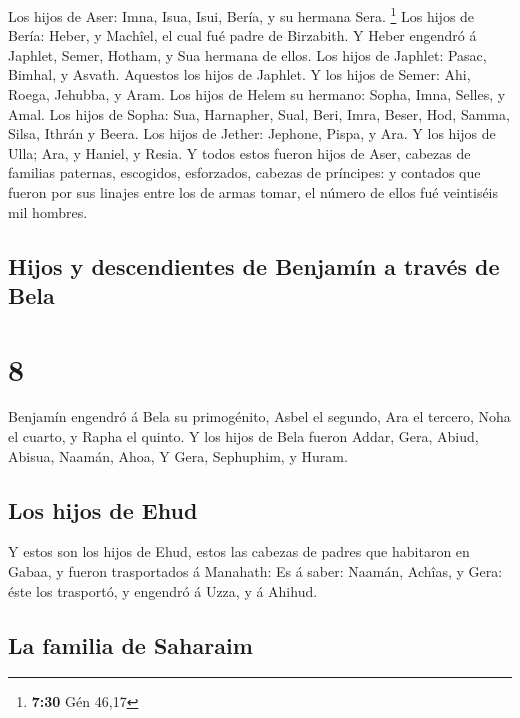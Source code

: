  Los hijos de Aser: Imna, Isua, Isui, Bería, y su hermana
Sera. \footnote{\textbf{7:30} Gén 46,17}  Los hijos de
Bería: Heber, y Machîel, el cual fué padre de Birzabith.  Y
Heber engendró á Japhlet, Semer, Hotham, y Sua hermana de ellos.
 Los hijos de Japhlet: Pasac, Bimhal, y Asvath. Aquestos
los hijos de Japhlet.  Y los hijos de Semer: Ahi, Roega,
Jehubba, y Aram.  Los hijos de Helem su hermano: Sopha,
Imna, Selles, y Amal.  Los hijos de Sopha: Sua, Harnapher,
Sual, Beri, Imra,  Beser, Hod, Samma, Silsa, Ithrán y
Beera.  Los hijos de Jether: Jephone, Pispa, y Ara.
 Y los hijos de Ulla; Ara, y Haniel, y Resia. 
Y todos estos fueron hijos de Aser, cabezas de familias paternas,
escogidos, esforzados, cabezas de príncipes: y contados que fueron por
sus linajes entre los de armas tomar, el número de ellos fué veintiséis
mil hombres.

\hypertarget{hijos-y-descendientes-de-benjamuxedn-a-travuxe9s-de-bela}{%
\subsection{Hijos y descendientes de Benjamín a través de
Bela}\label{hijos-y-descendientes-de-benjamuxedn-a-travuxe9s-de-bela}}

\hypertarget{section-7}{%
\section{8}\label{section-7}}

 Benjamín engendró á Bela su primogénito, Asbel el segundo,
Ara el tercero,  Noha el cuarto, y Rapha el quinto.
 Y los hijos de Bela fueron Addar, Gera, Abiud, 
Abisua, Naamán, Ahoa,  Y Gera, Sephuphim, y Huram.

\hypertarget{los-hijos-de-ehud}{%
\subsection{Los hijos de Ehud}\label{los-hijos-de-ehud}}

 Y estos son los hijos de Ehud, estos las cabezas de padres
que habitaron en Gabaa, y fueron trasportados á Manahath: 
Es á saber: Naamán, Achîas, y Gera: éste los trasportó, y engendró á
Uzza, y á Ahihud.

\hypertarget{la-familia-de-saharaim}{%
\subsection{La familia de Saharaim}\label{la-familia-de-saharaim}}

